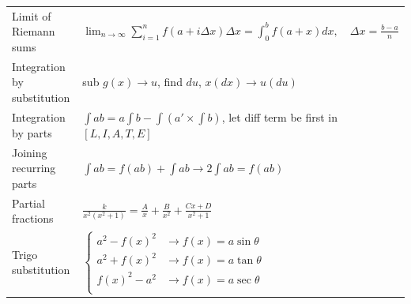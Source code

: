 \begin{landscape}
\begin{multicols*}{2}
\begin{tabularx}{\columnwidth}{@{}lX@{}}
            Limit of Riemann sums               & $\lim_{n\to\infty}\sum_{i=1}^{n}f(a+i\Delta x)\Delta x=\int_{0}^{b}f(a+x)dx,\quad\Delta x=\frac{b-a}{n}$                                                                                                                                                                                                               \\
            Integration by substitution         & sub $g(x)\to u$, find $du$, $x(dx)\to u(du)$                                                                                                                                                                                                                                                                           \\
            Integration by parts                & $\int ab=a\int b-\int (a'\times \int b)$, let diff term be first in $[L, I, A, T, E]$                                                                                                                                                                                                                                  \\
            Joining recurring parts             & $\int ab=f(ab)+\int ab\to 2\int ab = f(ab)$                                                                                                                                                                                                                                                                            \\
            Partial fractions                   & $\frac{k}{x^2(x^2+1)}=\frac{A}{x}+\frac{B}{x^2}+\frac{Cx+D}{x^2+1}$                                                                                                                                                                                                                                                    \\
            Trigo substitution                  & $\begin{cases}a^2-f(x)^2 & \to f(x)=a\sin\theta\\a^2+f(x)^2 & \to f(x)=a\tan\theta \\f(x)^2-a^2 & \to f(x)=a\sec\theta \\\end{cases}$                                                                                                                                                                                  \\

\end{tabularx}
\end{multicols*}
\end{landscape}
